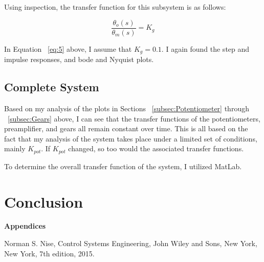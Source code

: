 \documentclass[12pt]{article}
\begin{document}
Using inspection, the transfer function for this subsystem is as follows:

\begin{equation}
\frac{\theta_{o}(s)}{\theta_{m}(s)} = K_{g}\label{eq:5}
\end{equation}

In Equation ~\ref{eq:5} above, I assume that $K_{g} = 0.1$. I again found the step and impulse responses, and bode and Nyquist plots.


\subsection{Complete System}

Based on my analysis of the plots in Sections ~\ref{subsec:Potentiometer} through ~\ref{subsec:Gears} above, I can see that the transfer functions of the potentiometers, preamplifier, and gears all remain constant over time. This is all based on the fact that my analysis of the system takes place under a limited set of conditions, mainly $K_{pot}$. If $K_{pot}$ changed, so too would the associated transfer functions.

To determine the overall transfer function of the system, I utilized MatLab.

\section{Conclusion}

\pagebreak

\textbf{Appendices}

\begin{appendices}


\end{appendices}

\begin{thebibliography}{9}

  Norman S. Nise,
  Control Systems Engineering,
  John Wiley and Sons, New York, New York,
  7th edition,
  2015.

\end{thebibliography}
\end{document}
